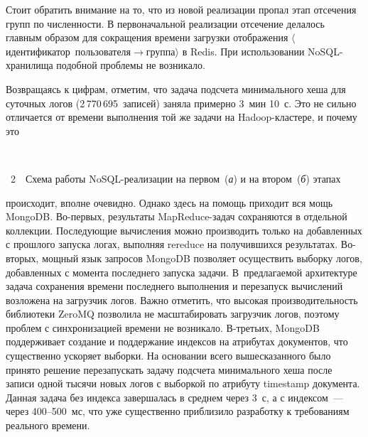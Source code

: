 \begin{multicols}{2}
   Стоит обратить внимание на то, что из новой реализации пропал этап 
отсечения групп по численности. В первоначальной реализации отсечение 
делалось главным образом для сокращения времени загрузки отображения 
$\langle$идентификатор\ пользователя\;$\rightarrow$\;группа$\rangle$ в Redis. При использовании NoSQL-хра\-ни\-ли\-ща 
подобной проблемы не возникало.
   
   Возвращаясь к цифрам, отметим, что задача подсчета минимального хеша 
для суточных логов (2\,770\,695~записей) заняла примерно 3~мин 
10~с. Это не сильно отличается от времени выполнения той же задачи на 
Hadoop-клас\-те\-ре, и почему это\linebreak\vspace*{-12pt}

\begin{center}  %
\vspace*{-3pt}
 \mbox{%
 \epsfxsize=80mm %
 }
 \end{center}
{{\figurename~2}\ \ \small{Схема работы NoSQL-реализации на первом~(\textit{а}) и на втором~(\textit{б}) этапах}}



\vspace*{15pt}

\addtocounter{figure}{1}

\noindent
 происходит, вполне очевидно. Однако здесь 
на помощь приходит вся мощь MongoDB. Во-пер\-вых, результаты 
   MapReduce-за\-дач сохраняются в отдельной коллекции. Последующие 
вычисления можно производить только на добавленных с прошлого запуска 
логах, выполняя rereduce на получившихся результатах. Во-вто\-рых, мощный 
язык запросов MongoDB позволяет осуществить выборку логов, добавленных с 
момента последнего запуска задачи. В~предлагаемой архитектуре задача 
сохранения времени последнего выполнения и перезапуск вы\-чис\-ле\-ний 
возложена на загрузчик логов. Важно отметить, что высокая 
производительность библиотеки ZeroMQ позволила не масштабировать 
загрузчик логов, поэтому проблем с синхронизацией времени не возникало. 
   В-третьих, MongoDB поддерживает создание и поддержание индексов на 
атрибутах документов, что существенно ускоряет выборки. На основании всего 
вышесказанного было принято решение перезапускать задачу подсчета 
минимального хеша после записи одной тысячи новых логов с выборкой по 
атрибуту {\sf timestamp} документа. Данная задача без индекса завершалась в 
среднем через 3~с, а с индексом~--- через 400--500~мс, что уже существенно 
приблизило разработку к требованиям реального времени.
   

\end{multicols}
